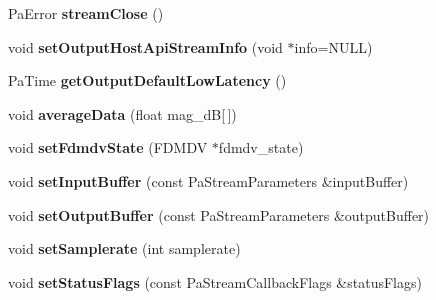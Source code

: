 \begin{DoxyCompactItemize}
\item 
\hypertarget{class_port_audio_wrap_a7f900dbb4003a1e01341e4f9f95c72e8}{Pa\-Error {\bfseries stream\-Close} ()}\label{class_port_audio_wrap_a7f900dbb4003a1e01341e4f9f95c72e8}

\item 
\hypertarget{class_port_audio_wrap_ab7d9fc6cda5c61cda105e6d9bba9215c}{void {\bfseries set\-Output\-Host\-Api\-Stream\-Info} (void $\ast$info=N\-U\-L\-L)}\label{class_port_audio_wrap_ab7d9fc6cda5c61cda105e6d9bba9215c}

\item 
\hypertarget{class_port_audio_wrap_a1014d8750069b7dc914e6f836da79660}{Pa\-Time {\bfseries get\-Output\-Default\-Low\-Latency} ()}\label{class_port_audio_wrap_a1014d8750069b7dc914e6f836da79660}

\item 
\hypertarget{class_port_audio_wrap_a987405b6ca5fbecb33ac69ddfe843659}{void {\bfseries average\-Data} (float mag\-\_\-d\-B\mbox{[}$\,$\mbox{]})}\label{class_port_audio_wrap_a987405b6ca5fbecb33ac69ddfe843659}

\item 
\hypertarget{class_port_audio_wrap_a65d6263d05a44f6696a3eb93a669e862}{void {\bfseries set\-Fdmdv\-State} (F\-D\-M\-D\-V $\ast$fdmdv\-\_\-state)}\label{class_port_audio_wrap_a65d6263d05a44f6696a3eb93a669e862}

\item 
\hypertarget{class_port_audio_wrap_a132273a300efd015cf3d66ee5b250216}{void {\bfseries set\-Input\-Buffer} (const Pa\-Stream\-Parameters \&input\-Buffer)}\label{class_port_audio_wrap_a132273a300efd015cf3d66ee5b250216}

\item 
\hypertarget{class_port_audio_wrap_a2284b3598963428bd5970b69a2ec0370}{void {\bfseries set\-Output\-Buffer} (const Pa\-Stream\-Parameters \&output\-Buffer)}\label{class_port_audio_wrap_a2284b3598963428bd5970b69a2ec0370}

\item 
\hypertarget{class_port_audio_wrap_a20f5cf508b5e13bd29632acb1af52d26}{void {\bfseries set\-Samplerate} (int samplerate)}\label{class_port_audio_wrap_a20f5cf508b5e13bd29632acb1af52d26}

\item 
\hypertarget{class_port_audio_wrap_ad2c8ee53c0f11504777d1dc41747b453}{void {\bfseries set\-Status\-Flags} (const Pa\-Stream\-Callback\-Flags \&status\-Flags)}\label{class_port_audio_wrap_ad2c8ee53c0f11504777d1dc41747b453}


\end{DoxyCompactItemize}
